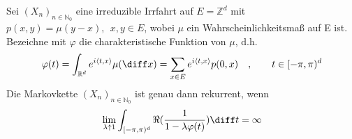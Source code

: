 \label{Chung-Fuchs}
Sei $(X_{n})_{n \in \mathbb{N}_{0}}$ eine irreduzible Irrfahrt auf $E = \mathbb{Z}^{d}$ mit $p(x,y) = \mu (y-x), \: \: x,y \in E$, wobei $\mu$ ein Wahrscheinlichkeitsmaß auf E ist. Bezeichne mit $\varphi$ die charakteristische Funktion von $\mu$, d.h.
\begin{equation*}
\varphi(t) = \int_{\mathbb{R}^{d}} e^{i \langle t,x \rangle} \mu (\diff x ) = \sum_{x \in E} e^{i \langle t,x \rangle} p(0,x) \quad , \qquad t \in [-\pi, \pi)^{d}
\end{equation*}
Die Markovkette $(X_{n})_{n \in \mathbb{N}_{0}}$ ist genau dann rekurrent, wenn
\begin{equation*}
\lim_{\lambda \uparrow 1} \int_{[-\pi, \pi)^{d}} \Re (\dfrac{1}{1-\lambda \varphi(t)}) \diff t  = \infty
\end{equation*}